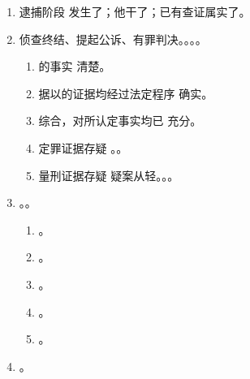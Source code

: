 \begin{enumerate}
\begin{enumerate}
          \item 逮捕阶段 \yjt 发生了；他干了；已有查证属实了。
          \item 侦查终结、提起公诉、有罪判决。。。。
                \begin{enumerate}
                  \item {}的事实 \yjt 清楚。
                  \item 据以的证据均经过法定程序 \yjt 确实。
                  \item 综合，对所认定事实均已 \yjt 充分。
                  \item 定罪证据存疑 \yjt {}。。
                  \item 量刑证据存疑 \yjt 疑案从轻。。。
                \end{enumerate}
          \item {}。。
                \begin{enumerate}
                  \item {}。
                  \item {}。
                  \item {}。
                  \item {}。
                  \item {}。
                \end{enumerate}
          \item {}。
        \end{enumerate}
\end{enumerate}

